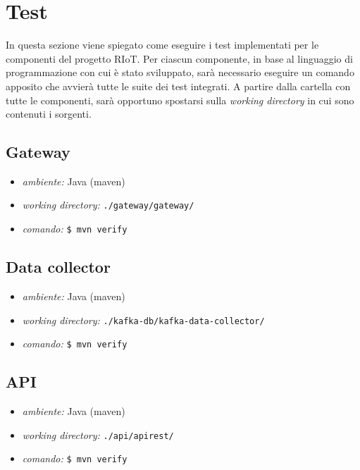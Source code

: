 \section{Test}
	In questa sezione viene spiegato come eseguire i test implementati per le componenti del progetto RIoT.
	Per ciascun componente, in base al linguaggio di programmazione con cui è stato sviluppato, sarà necessario eseguire un comando apposito che avvierà tutte le suite dei test integrati.
	A partire dalla cartella con tutte le componenti, sarà opportuno spostarsi sulla \textit{working directory} in cui sono contenuti i sorgenti. 

	\subsection{Gateway}
		
		\begin{itemize}
			\item \textit{ambiente:} Java (maven)
			\item \textit{working directory:} \verb!./gateway/gateway/!
			\item \textit{comando:} \verb!$ mvn verify!
		\end{itemize}
		

	\subsection{Data collector}

		\begin{itemize}
			\item \textit{ambiente:} Java (maven)
			\item \textit{working directory:} \verb!./kafka-db/kafka-data-collector/!
			\item \textit{comando:} \verb!$ mvn verify!
		\end{itemize}

	\subsection{API}

		\begin{itemize}
			\item \textit{ambiente:} Java (maven)
			\item \textit{working directory:} \verb!./api/apirest/!
			\item \textit{comando:} \verb!$ mvn verify!
		\end{itemize}


